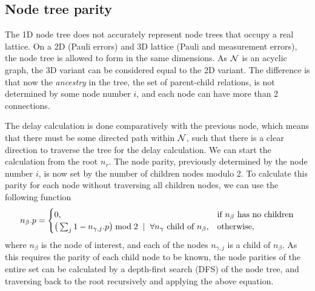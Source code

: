 \subsection{Node tree parity}

The 1D node tree does not accurately represent node trees that occupy a real lattice. On a 2D (Pauli errors) and 3D lattice (Pauli and measurement errors), the node tree is allowed to form in the same dimensions. As $\mathcal{N}$ is an acyclic graph, the 3D variant can be considered equal to the 2D variant. The difference is that now the \emph{ancestry} in the tree, the set of parent-child relations, is not determined by some node number $i$, and each node can have more than 2 connections.

The delay calculation is done comparatively with the previous node, which means that there must be some directed path within $\mathcal{N}$, such that there is a clear direction to traverse the tree for the delay calculation. We can start the calculation from the root $n_r$. The node parity, previously determined by the node number $i$, is now set by the number of children nodes modulo 2. To calculate this parity for each node without traversing all children nodes, we can use the following function
\begin{equation}\label{eq:nodeparitypart}
  n_\beta.p =
  \begin{cases}
    0, & \mbox{if $n_\beta$ has no children}  \\
    \big( \sum_{j} 1-n_{\gamma,j}.p \big ) \bmod 2 \hspace{.2cm} | \hspace{.2cm} \forall n_\gamma \mbox{ child of } n_\beta, & \mbox{otherwise},
  \end{cases}
\end{equation}
where $n_\beta$ is the node of interest, and each of the nodes $n_{\gamma,j}$ is a child of $n_\beta$. As this requires the parity of each child node to be known, the node parities of the entire set can be calculated by a depth-first search (DFS) of the node tree, and traversing back to the root recursively and applying the above equation.

